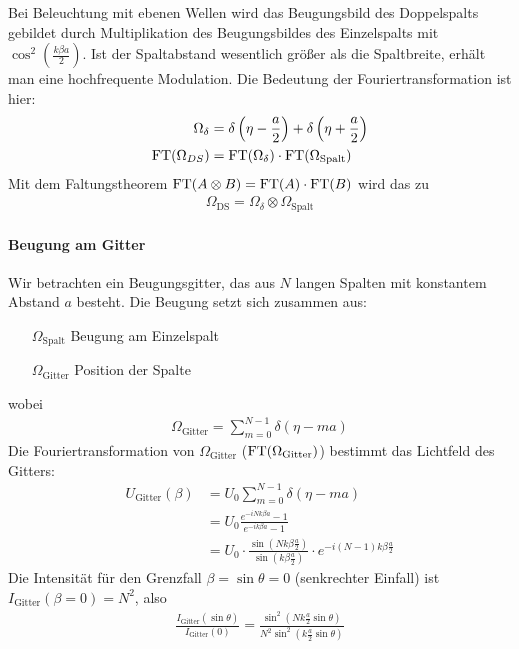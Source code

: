 Bei Beleuchtung mit ebenen Wellen wird das Beugungsbild des
Doppelspalts gebildet durch Multiplikation des Beugungsbildes des
Einzelspalts mit $\cos^2\left(\frac{k\beta a}{2}\right)$.
Ist der Spaltabstand wesentlich größer als die Spaltbreite, erhält man
eine hochfrequente Modulation.
Die Bedeutung der Fouriertransformation ist hier:
\begin{align*}
  \Omega_\delta 
  &= \delta\left( \eta-\frac{a}{2} \right) 
    +  \delta\left( \eta+\frac{a}{2} \right)\\
  \operatorname{FT}(\Omega_{DS}) 
  &= \operatorname{FT}(\Omega_\delta) \cdot \operatorname{FT}(\Omega_\text{Spalt})
\end{align*}
Mit dem Faltungstheorem 
$\operatorname{FT}(A\otimes B) = \operatorname{FT}(A)\cdot\operatorname{FT}(B)$
wird das zu
\begin{gather*}
  \Omega_\text{DS} = \Omega_\delta \otimes \Omega_\text{Spalt}
\end{gather*}



\paragraph{Beugung am Gitter}
Wir betrachten ein Beugungsgitter, das aus $N$ langen Spalten mit
konstantem Abstand $a$ besteht.
Die Beugung setzt sich zusammen aus:
\begin{itemize}
\item[$\Omega_\text{Spalt}$] Beugung am Einzelspalt
\item[$\Omega_\text{Gitter}$] Position der Spalte
\end{itemize}
wobei
\begin{align*}
  \Omega_\text{Gitter} = \sum_{m=0}^{N-1}\delta(\eta-ma)
\end{align*}
Die Fouriertransformation von $\Omega_\text{Gitter}$
($\operatorname{FT}(\Omega_\text{Gitter})$) bestimmt das Lichtfeld des Gitters:
\begin{align*}
  U_\text{Gitter}(\beta) 
  &= U_0 \sum_{m=0}^{N-1} \delta(\eta-ma)\\
  &= U_0 \frac
    {e^{-iNk\beta a} - 1}
    {e^{-i k\beta a} - 1} \\
  &= U_0 \cdot \frac
    { \sin\left( Nk\beta\frac{a}{2} \right) }
    { \sin\left(  k\beta\frac{a}{2} \right) }
    \cdot e^{-i(N-1)k\beta\frac{a}{2}}
\end{align*}
Die Intensität für den Grenzfall $\beta=\sin\theta=0$ (senkrechter
Einfall) ist
$I_\text{Gitter}(\beta=0) = N^2$, also
\begin{gather*}
  \frac{ I_\text{Gitter}(\sin\theta) }{ I_\text{Gitter}(0)}
  = \frac
  {    \sin^2\left( Nk\frac{a}{2} \sin\theta \right) }
  { N^2\sin^2\left(  k\frac{a}{2} \sin\theta \right) }
\end{gather*}

